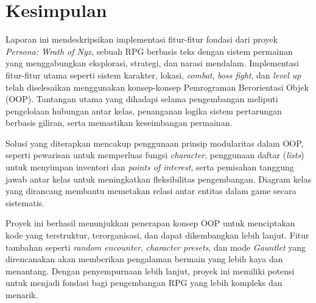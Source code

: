 \documentclass[12pt]{article}
\begin{document}
\section{Kesimpulan}
Laporan ini mendeskripsikan implementasi fitur-fitur fondasi dari proyek \textit{Persona: Wrath of Nyx}, sebuah RPG berbasis teks dengan sistem permainan yang menggabungkan eksplorasi, strategi, dan narasi mendalam. Implementasi fitur-fitur utama seperti sistem karakter, lokasi, \textit{combat}, \textit{boss fight}, dan \textit{level up} telah diselesaikan menggunakan konsep-konsep Pemrograman Berorientasi Objek (OOP). Tantangan utama yang dihadapi selama pengembangan meliputi pengelolaan hubungan antar kelas, penanganan logika sistem pertarungan berbasis giliran, serta memastikan keseimbangan permainan.

Solusi yang diterapkan mencakup penggunaan prinsip modularitas dalam OOP, seperti pewarisan untuk memperluas fungsi \textit{character}, penggunaan daftar (\textit{lists}) untuk menyimpan inventori dan \textit{points of interest}, serta pemisahan tanggung jawab antar kelas untuk meningkatkan fleksibilitas pengembangan. Diagram kelas yang dirancang membantu memetakan relasi antar entitas dalam game secara sistematis.

Proyek ini berhasil menunjukkan penerapan konsep OOP untuk menciptakan kode yang terstruktur, terorganisasi, dan dapat dikembangkan lebih lanjut. Fitur tambahan seperti \textit{random encounter}, \textit{character presets}, dan mode \textit{Gauntlet} yang direncanakan akan memberikan pengalaman bermain yang lebih kaya dan menantang. Dengan penyempurnaan lebih lanjut, proyek ini memiliki potensi untuk menjadi fondasi bagi pengembangan RPG yang lebih kompleks dan menarik.
\end{document}
